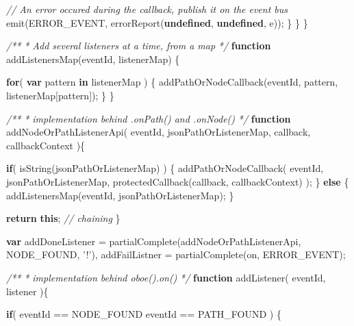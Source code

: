 \documentclass[]{article}
\newenvironment{Shaded}{}{}
\newcommand{\KeywordTok}[1]{\textcolor[rgb]{0.00,0.44,0.13}{\textbf{{#1}}}}
\newcommand{\StringTok}[1]{\textcolor[rgb]{0.25,0.44,0.63}{{#1}}}
\newcommand{\CommentTok}[1]{\textcolor[rgb]{0.38,0.63,0.69}{\textit{{#1}}}}
\newcommand{\FunctionTok}[1]{\textcolor[rgb]{0.02,0.16,0.49}{{#1}}}
\newcommand{\NormalTok}[1]{{#1}}
\begin{document}
\begin{Shaded}
\begin{Highlighting}[]
            \CommentTok{// An error occured during the callback, publish it on the event bus }
            \FunctionTok{emit}\NormalTok{(ERROR_EVENT, }\FunctionTok{errorReport}\NormalTok{(}\KeywordTok{undefined}\NormalTok{, }\KeywordTok{undefined}\NormalTok{, e));}
         \NormalTok{\}      }
      \NormalTok{\}   }
   \NormalTok{\}}
   

   \CommentTok{/**}
\CommentTok{    * Add several listeners at a time, from a map}
\CommentTok{    */}
   \KeywordTok{function} \FunctionTok{addListenersMap}\NormalTok{(eventId, listenerMap) \{}
   
      \KeywordTok{for}\NormalTok{( }\KeywordTok{var} \NormalTok{pattern }\KeywordTok{in} \NormalTok{listenerMap ) \{}
         \FunctionTok{addPathOrNodeCallback}\NormalTok{(eventId, pattern, listenerMap[pattern]);}
      \NormalTok{\}}
   \NormalTok{\}    }
      
   \CommentTok{/**}
\CommentTok{    * implementation behind .onPath() and .onNode()}
\CommentTok{    */}       
   \KeywordTok{function} \FunctionTok{addNodeOrPathListenerApi}\NormalTok{( eventId, jsonPathOrListenerMap,}
                                      \NormalTok{callback, callbackContext )\{}
 
      \KeywordTok{if}\NormalTok{( }\FunctionTok{isString}\NormalTok{(jsonPathOrListenerMap) ) \{}
         \FunctionTok{addPathOrNodeCallback}\NormalTok{( }
            \NormalTok{eventId, }
            \NormalTok{jsonPathOrListenerMap,}
            \FunctionTok{protectedCallback}\NormalTok{(callback, callbackContext)}
         \NormalTok{);}
      \NormalTok{\} }\KeywordTok{else} \NormalTok{\{}
         \FunctionTok{addListenersMap}\NormalTok{(eventId, jsonPathOrListenerMap);}
      \NormalTok{\}}
      
      \KeywordTok{return} \KeywordTok{this}\NormalTok{; }\CommentTok{// chaining}
   \NormalTok{\}}
   
   \KeywordTok{var} \NormalTok{addDoneListener = }\FunctionTok{partialComplete}\NormalTok{(addNodeOrPathListenerApi, NODE_FOUND, }\StringTok{'!'}\NormalTok{),}
       \NormalTok{addFailListner = }\FunctionTok{partialComplete}\NormalTok{(on, ERROR_EVENT);}
   
   \CommentTok{/**}
\CommentTok{    * implementation behind oboe().on()}
\CommentTok{    */}       
   \KeywordTok{function} \FunctionTok{addListener}\NormalTok{( eventId, listener )\{}
                         
      \KeywordTok{if}\NormalTok{( eventId == NODE_FOUND \textbar{}\textbar{} eventId == PATH_FOUND ) \{}
                                

\end{Highlighting}
\end{Shaded}
\end{document}
